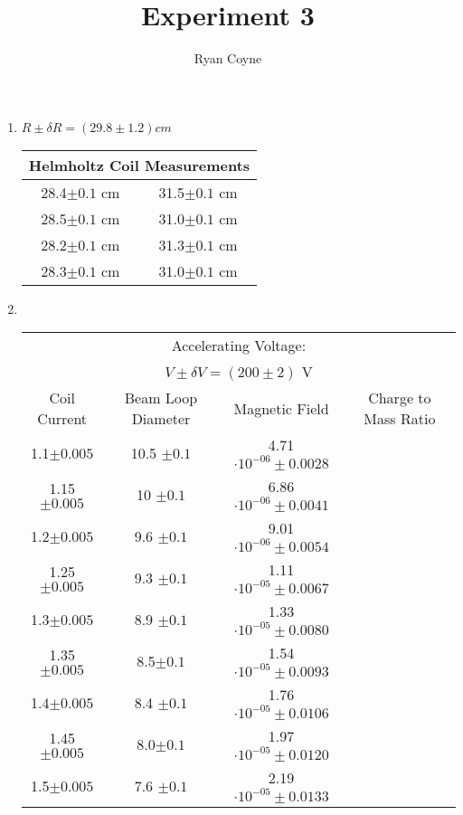 \documentclass[12pt]{article}
\begin{document}
    \title{Experiment 3}
    \author{Ryan Coyne}
    \maketitle

    \begin{enumerate}
        \item \(R \pm \delta R = (29.8 \pm 1.2) cm\) 
        \begin{table}[H]
            \centering
            \begin{tabular}{c|c}
                \multicolumn{2}{c}{Helmholtz Coil Measurements}\\
                \hline
                28.4\(\pm 0.1\) cm & 31.5\(\pm 0.1\) cm\\
                28.5\(\pm 0.1\) cm & 31.0\(\pm 0.1\) cm\\
                28.2\(\pm 0.1\) cm & 31.3\(\pm 0.1\) cm\\
                28.3\(\pm 0.1\) cm & 31.0\(\pm 0.1\) cm
            \end{tabular}
        \end{table}
        \item \, \begin{table}[h]
        \centering
        \begin{tabular}{c|c|c|c}
            \multicolumn{4}{c}{Accelerating Voltage:}\\
            \multicolumn{4}{c}{\(V\pm\delta V = (200 \pm 2) \) V}\\
            Coil Current & Beam Loop Diameter & Magnetic Field & Charge to Mass Ratio\\
            \hline
            1.1\(\pm 0.005\) & 10.5 \(\pm 0.1\)& 4.71\(\cdot 10^{-06} \pm 0.0028\) & \\
            1.15\(\pm 0.005\)& 10 \(\pm 0.1\)  & 6.86\(\cdot 10^{-06} \pm 0.0041\) & \\
            1.2\(\pm 0.005\) & 9.6 \(\pm 0.1\) & 9.01\(\cdot 10^{-06} \pm 0.0054\) & \\
            1.25\(\pm 0.005\)& 9.3 \(\pm 0.1\) & 1.11\(\cdot 10^{-05} \pm 0.0067\) & \\
            1.3\(\pm 0.005\)& 8.9 \(\pm 0.1\) & 1.33\(\cdot 10^{-05}  \pm 0.0080\) & \\
            1.35\(\pm 0.005\)& 8.5\(\pm 0.1\) & 1.54\(\cdot 10^{-05}  \pm 0.0093\) & \\
            1.4\(\pm 0.005\) & 8.4 \(\pm 0.1\) & 1.76\(\cdot 10^{-05} \pm 0.0106\) & \\
            1.45\(\pm 0.005\)& 8.0\(\pm 0.1\) & 1.97\(\cdot 10^{-05}  \pm 0.0120\) & \\
            1.5\(\pm 0.005\)& 7.6 \(\pm 0.1\) & 2.19\(\cdot 10^{-05}  \pm 0.0133\) & \\
        \end{tabular}
    \end{table}
    \end{enumerate}
\end{document}
